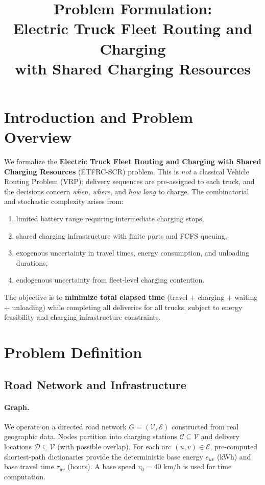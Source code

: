 \documentclass[11pt]{article}
\title{Problem Formulation:\\[4pt] Electric Truck Fleet Routing and Charging\\with Shared Charging Resources}
\author{}
\date{}
\begin{document}
\maketitle

\section{Introduction and Problem Overview}

We formalize the \textbf{Electric Truck Fleet Routing and Charging with Shared Charging Resources} (ETFRC-SCR) problem. This is \emph{not} a classical Vehicle Routing Problem (VRP): delivery sequences are pre-assigned to each truck, and the decisions concern \emph{when}, \emph{where}, and \emph{how long} to charge. The combinatorial and stochastic complexity arises from:
\begin{enumerate}[nosep]
    \item limited battery range requiring intermediate charging stops,
    \item shared charging infrastructure with finite ports and FCFS queuing,
    \item exogenous uncertainty in travel times, energy consumption, and unloading durations,
    \item endogenous uncertainty from fleet-level charging contention.
\end{enumerate}
The objective is to \textbf{minimize total elapsed time} (travel $+$ charging $+$ waiting $+$ unloading) while completing all deliveries for all trucks, subject to energy feasibility and charging infrastructure constraints.

\section{Problem Definition}

\subsection{Road Network and Infrastructure}

\paragraph{Graph.}
We operate on a directed road network $G=(\mathcal{V},\mathcal{E})$ constructed from real geographic data. Nodes partition into charging stations $\mathcal{C}\subseteq\mathcal{V}$ and delivery locations $\mathcal{D}\subseteq\mathcal{V}$ (with possible overlap). For each arc $(u,v)\in\mathcal{E}$, pre-computed shortest-path dictionaries provide the deterministic base energy $e_{uv}$ (kWh) and base travel time $\tau_{uv}$ (hours). A base speed $v_0=40$ km/h is used for time computation.
\end{document}

